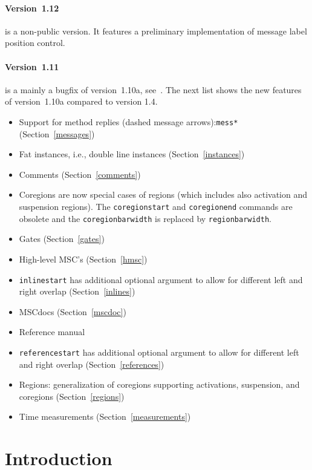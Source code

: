\documentclass[12pt,a4paper]{article}
\newcommand{\cmd}[1]{\texttt{\bslash #1}}
\newcommand{\acro}[1]{{#1}}
\newcommand{\MSC}{\acro{MSC}}
\newcommand{\MSCdoc}{\MSC{}doc}
\begin{document}
\paragraph{Version~1.12} is a non-public version. It features a preliminary
implementation of message label position control.

\paragraph{Version~1.11} is a mainly a bugfix of version~1.10a, see~\cite{BM02b}.
The next list shows the new features of version~1.10a compared to
version 1.4.

\begin{itemize}
\item Support for method replies (dashed message arrows):\cmd{mess*} (Section~\ref{messages})
\item Fat instances, i.e., double line instances (Section~\ref{instances})
\item Comments (Section~\ref{comments})
\item Coregions are now special cases of regions (which includes also
activation and suspension regions). The \cmd{coregionstart} and
\cmd{coregionend} commands are obsolete and the \cmd{coregionbarwidth}
is replaced by \cmd{regionbarwidth}.
\item Gates (Section~\ref{gates})
\item High-level \MSC{}'s (Section~\ref{hmsc})
\item \cmd{inlinestart} has additional optional argument to allow for different left and right overlap (Section~\ref{inlines})
\item \MSCdoc{}s (Section~\ref{mscdoc})
\item Reference manual~\cite{BM02}
\item \cmd{referencestart} has additional optional argument to allow for different left and right overlap (Section~\ref{references})
\item Regions: generalization of coregions supporting activations, suspension, and coregions (Section~\ref{regions})
\item Time measurements (Section~\ref{measurements})
\end{itemize}


\section{Introduction}
\label{introduction}
\end{document}
